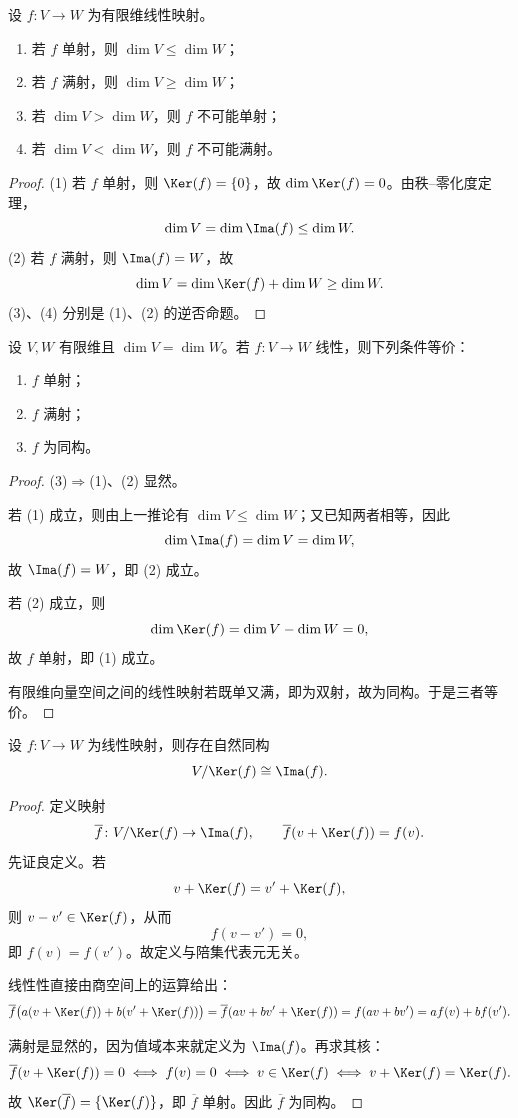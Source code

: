 \begin{corollary}
设 $f\colon V\to W$ 为有限维线性映射。
\begin{enumerate}[label=\textnormal{(\arabic*)}]
  \item 若 $f$ 单射，则 $\dim V\le \dim W$；
  \item 若 $f$ 满射，则 $\dim V\ge \dim W$；
  \item 若 $\dim V>\dim W$，则 $f$ 不可能单射；
  \item 若 $\dim V<\dim W$，则 $f$ 不可能满射。
\end{enumerate}
\end{corollary}

\begin{proof}
(1) 若 $f$ 单射，则 $\Ker(f)=\{0\}$，故 $\dim\Ker(f)=0$。由秩--零化度定理，
\[
  \dim V=\dim\Ima(f)\le \dim W.
\]
(2) 若 $f$ 满射，则 $\Ima(f)=W$，故
\[
  \dim V=\dim\Ker(f)+\dim W\ge \dim W.
\]
(3)、(4) 分别是 (1)、(2) 的逆否命题。
\end{proof}

\begin{corollary}
设 $V,W$ 有限维且 $\dim V=\dim W$。若 $f\colon V\to W$ 线性，则下列条件等价：
\begin{enumerate}[label=\textnormal{(\arabic*)}]
  \item $f$ 单射；
  \item $f$ 满射；
  \item $f$ 为同构。
\end{enumerate}
\end{corollary}

\begin{proof}
(3)$\Rightarrow$(1)、(2) 显然。

若 (1) 成立，则由上一推论有 $\dim V\le \dim W$；又已知两者相等，因此
\[
  \dim\Ima(f)=\dim V=\dim W,
\]
故 $\Ima(f)=W$，即 (2) 成立。

若 (2) 成立，则
\[
  \dim\Ker(f)=\dim V-\dim W=0,
\]
故 $f$ 单射，即 (1) 成立。

有限维向量空间之间的线性映射若既单又满，即为双射，故为同构。于是三者等价。
\end{proof}

\begin{proposition}[第一同构定理]
设 $f\colon V\to W$ 为线性映射，则存在自然同构
\[
  V/\Ker(f)\cong \Ima(f).
\]
\end{proposition}

\begin{proof}
定义映射
\[
  \overline f\colon V/\Ker(f)\to \Ima(f),
  \qquad
  \overline f(v+\Ker(f))=f(v).
\]
先证良定义。若
\[
  v+\Ker(f)=v'+\Ker(f),
\]
则 $v-v'\in\Ker(f)$，从而
\[
  f(v-v')=0,
\]
即 $f(v)=f(v')$。故定义与陪集代表元无关。

线性性直接由商空间上的运算给出：
\[
  \overline f\bigl(a(v+\Ker(f))+b(v'+\Ker(f))\bigr)
  =\overline f(av+bv'+\Ker(f))
  =f(av+bv')
  =a f(v)+b f(v').
\]

满射是显然的，因为值域本来就定义为 $\Ima(f)$。再求其核：
\[
  \overline f(v+\Ker(f))=0
  \iff f(v)=0
  \iff v\in\Ker(f)
  \iff v+\Ker(f)=\Ker(f).
\]
故 $\Ker(\overline f)=\{\Ker(f)\}$，即 $\overline f$ 单射。因此 $\overline f$ 为同构。
\end{proof}


